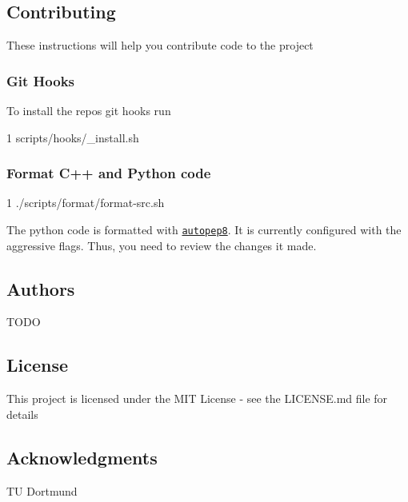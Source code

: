 \subsection*{Contributing}

These instructions will help you contribute code to the project

\subsubsection*{Git Hooks}

To install the repos git hooks run 
\begin{DoxyCode}
1 scripts/hooks/\_install.sh
\end{DoxyCode}


\subsubsection*{Format C++ and Python code}


\begin{DoxyCode}
1 ./scripts/format/format-src.sh
\end{DoxyCode}


The python code is formatted with \href{https://github.com/hhatto/autopep8}{\tt autopep8}. It is currently configured with the aggressive flags. Thus, you need to review the changes it made.

\subsection*{Authors}


\begin{DoxyItemize}
\item T\+O\+DO
\end{DoxyItemize}

\subsection*{License}

This project is licensed under the M\+IT License -\/ see the L\+I\+C\+E\+N\+SE.md file for details

\subsection*{Acknowledgments}


\begin{DoxyItemize}
\item TU Dortmund 
\end{DoxyItemize}